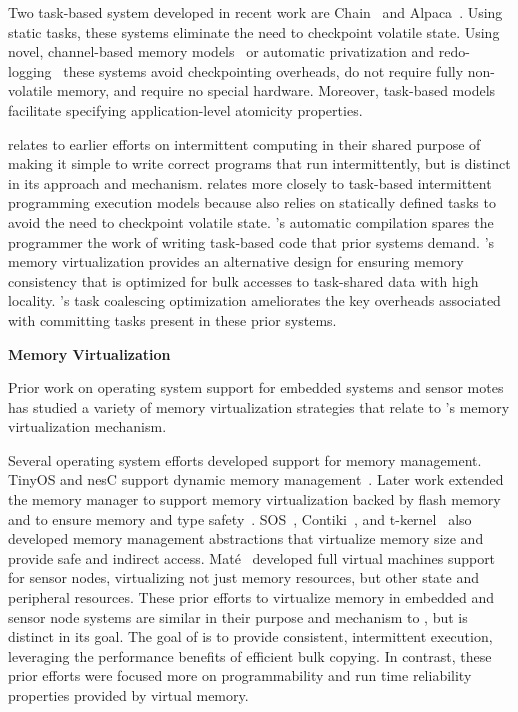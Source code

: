 Two task-based system developed in recent work are Chain~\cite{chain} and
Alpaca~\cite{alpaca}.  Using static tasks, these systems eliminate the need to
checkpoint volatile state.  Using novel, channel-based memory
models~\cite{chain} or automatic privatization and redo-logging~\cite{alpaca}
these systems avoid checkpointing overheads, do not require fully non-volatile
memory, and require no special hardware.  Moreover, task-based models
facilitate specifying application-level atomicity properties.

\sys relates to earlier efforts on intermittent computing in their shared
purpose of making it simple to write correct programs that run intermittently,
but is distinct in its approach and mechanism.  \sys relates more closely to
task-based intermittent programming execution models because \sys also relies
on statically defined tasks to avoid the need to checkpoint volatile state.
\sys's automatic compilation spares the programmer the work of writing
task-based code that prior systems demand.  \sys's memory virtualization
provides an alternative design for ensuring memory consistency that is
optimized for bulk accesses to task-shared data with high locality.  \sys's
task coalescing optimization ameliorates the key overheads associated with
committing tasks present in these prior systems.  

{\noindent \bf Memory Virtualization}

Prior work on operating system support for embedded systems and sensor motes
has studied a variety of memory virtualization strategies that relate to \sys's
memory virtualization mechanism.

Several operating system efforts developed support for memory management.
TinyOS and nesC support dynamic memory management~\cite{nesc}.  Later work
extended the memory manager to support memory virtualization backed by flash
memory~\cite{sensornetvm} and to ensure memory and type
safety~\cite{tinyosmemorysafety}. SOS~\cite{sos}, Contiki~\cite{contiki}, and
t-kernel~\cite{tkernel} also developed memory management abstractions that
virtualize memory size and provide safe and indirect access.
Mat\'e~\cite{mate} developed full virtual machines support for sensor nodes,
virtualizing not just memory resources, but other state and peripheral
resources.  These prior efforts to virtualize memory in embedded and sensor
node systems are similar in their purpose and mechanism to \sys, but \sys is
distinct in its goal.  The goal of \sys is to provide consistent, intermittent
execution, leveraging the performance benefits of efficient bulk copying.  In
contrast, these prior efforts were focused more on programmability and run time
reliability properties provided by virtual memory. 

